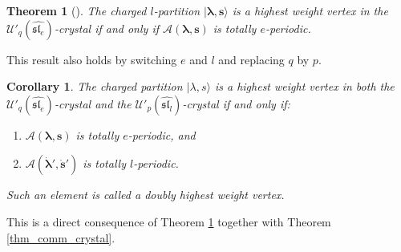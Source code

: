 \documentclass[twoside,12pt]{amsart}
\theoremstyle{plain}
\newcommand{\cA}{\mathcal{A}}
\newcommand{\bs}{\mathbf{s}}
\newcommand{\la}{\lambda}
\newcommand{\bla}{\boldsymbol{\la}}
\newcommand{\dbs}{\dot{\bs}}
\newcommand{\dbla}{\dot{\bla}}
\newcommand{\Ue}{\mathcal{U}'_q (\widehat{\mathfrak{sl}_e})}
\newcommand{\Ul}{\mathcal{U}'_p (\widehat{\mathfrak{sl}_l})}
\newtheorem{thm}[num]{Theorem}
\newtheorem{cor}[num]{Corollary}
\theoremstyle{remark}
\begin{document}
\begin{thm}[\mbox{\cite[Theorem 5.9]{JaconLecouvey2012}}]\label{thm_hw_vertices}
The charged $l$-partition $|\bla,\bs\rangle$ is a highest weight vertex
in the $\Ue$-crystal if and only if $\cA(\bla,\bs)$ is totally $e$-periodic.
\end{thm}

This result also holds by switching $e$ and $l$ and replacing $q$ by $p$.

\begin{cor} The charged partition $|\la,s\rangle$ is a
highest weight vertex in both the $\Ue$-crystal and the $\Ul$-crystal
if and only if:
\begin{enumerate}
 \item $\cA(\bla,\bs)$ is totally $e$-periodic, and
 \item $\cA(\dbla',\dbs')$ is totally $l$-periodic.
\end{enumerate}
Such an element is called a \textit{doubly highest weight vertex}.
\end{cor}

\proof
This is a direct consequence of Theorem \ref{thm_hw_vertices}
together with Theorem \ref{thm_comm_crystal}.
\endproof
\end{document}
